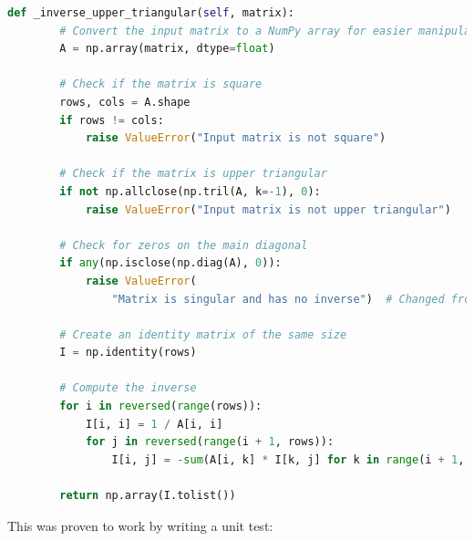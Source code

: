 \documentclass[12pt]{article}
\begin{document}
    \FloatBarrier

    \begin{lstlisting}[language=Python]
    def _inverse_upper_triangular(self, matrix):
        # Convert the input matrix to a NumPy array for easier manipulation
        A = np.array(matrix, dtype=float)

        # Check if the matrix is square
        rows, cols = A.shape
        if rows != cols:
            raise ValueError("Input matrix is not square")

        # Check if the matrix is upper triangular
        if not np.allclose(np.tril(A, k=-1), 0):
            raise ValueError("Input matrix is not upper triangular")

        # Check for zeros on the main diagonal
        if any(np.isclose(np.diag(A), 0)):
            raise ValueError(
                "Matrix is singular and has no inverse")  # Changed from return None for consistency

        # Create an identity matrix of the same size
        I = np.identity(rows)

        # Compute the inverse
        for i in reversed(range(rows)):
            I[i, i] = 1 / A[i, i]
            for j in reversed(range(i + 1, rows)):
                I[i, j] = -sum(A[i, k] * I[k, j] for k in range(i + 1, j + 1)) / A[i, i]

        return np.array(I.tolist())
    \end{lstlisting}

    This was proven to work by writing a unit test:

    \FloatBarrier
\end{document}

